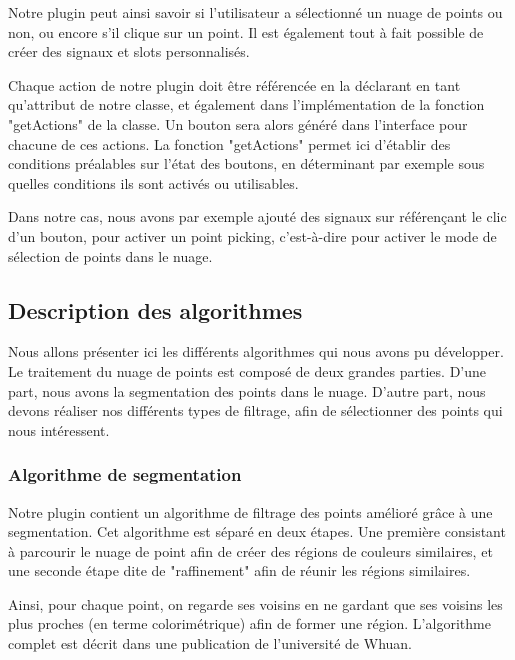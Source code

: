 \documentclass[12pt,titlepage,french]{article}
\begin{document}
Notre plugin peut ainsi savoir si l'utilisateur a sélectionné un nuage de points ou non, ou encore s'il clique sur un point. Il est également tout à fait possible de créer des signaux et slots personnalisés. \newline

Chaque action de notre plugin doit être référencée en la déclarant en tant qu'attribut de notre classe, et également dans l'implémentation de la fonction "getActions" de la classe. Un bouton sera alors généré dans l'interface pour chacune de ces actions. La fonction "getActions" permet ici d'établir des conditions préalables sur l'état des boutons, en déterminant par exemple sous quelles conditions ils sont activés ou utilisables. \newline

Dans notre cas, nous avons par exemple ajouté des signaux sur référençant le clic d'un bouton, pour activer un point picking, c'est-à-dire pour activer le mode de sélection de points dans le nuage.

\subsection{Description des algorithmes}

Nous allons présenter ici les différents algorithmes qui nous avons pu développer. Le traitement du nuage de points est composé de deux grandes parties. D'une part, nous avons la segmentation des points dans le nuage. D'autre part, nous devons réaliser nos différents types de filtrage, afin de sélectionner des points qui nous intéressent.

\subsubsection{Algorithme de segmentation}

Notre plugin contient un algorithme de filtrage des points amélioré grâce à une segmentation. Cet algorithme est séparé en deux étapes. Une première consistant à parcourir le nuage de point afin de créer des régions de couleurs similaires, et une seconde étape dite de "raffinement" afin de réunir les régions similaires. \newline

Ainsi, pour chaque point, on regarde ses voisins en ne gardant que ses voisins les plus proches (en terme colorimétrique) afin de former une région. L'algorithme complet est décrit dans une publication de l'université de \cite{B01} Whuan. \newline
\end{document}
